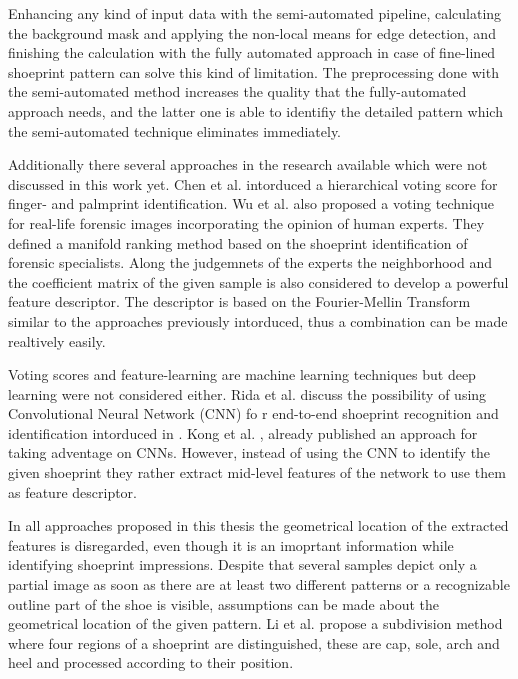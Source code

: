 \documentclass[draft,final]{vutinfth} %
\begin{document}
Enhancing any kind of input data with the semi-automated pipeline, calculating the background mask and applying the non-local means for edge detection, and finishing the calculation with the fully automated approach in case of fine-lined shoeprint pattern can solve this kind of limitation.
The preprocessing done with the semi-automated method increases the quality that the fully-automated approach needs, and the latter one is able to identifiy the detailed pattern which the semi-automated technique eliminates immediately.
\par
Additionally there several approaches in the research available which were not discussed in this work yet.
Chen et al. \cite{chen2013hierarchical} intorduced a hierarchical voting score for finger- and palmprint identification.
Wu et al. \cite{wu2019losgsr} also proposed a voting technique for real-life forensic images incorporating the opinion of human experts.
They defined a manifold ranking method based on the shoeprint identification of forensic specialists.
Along the judgemnets of the experts the neighborhood and the coefficient matrix of the given sample is also considered to develop a powerful feature descriptor.
The descriptor is based on the Fourier-Mellin Transform similar to the approaches previously intorduced, thus a combination can be made realtively easily.
\par
Voting scores and feature-learning are machine learning techniques but deep learning \cite{lecun2015deep} were not considered either.
Rida et al. \cite{rida2019forensic} discuss the possibility of using Convolutional Neural Network (CNN) fo
r end-to-end shoeprint recognition and identification intorduced in \cite{lecun1998gradient}.
Kong et al. \cite{kong2017cross}, \cite{kong2019cross} already published an approach for taking adventage on CNNs.
However, instead of using the CNN to identify the given shoeprint they rather extract mid-level features of the network to use them as feature descriptor.
\par
In all approaches proposed in this thesis the geometrical location of the extracted features is disregarded, even though it is an imoprtant information while identifying shoeprint impressions.
Despite that several samples depict only a partial image as soon as there are at least two different patterns or a recognizable outline part of the shoe is visible, assumptions can be made about the geometrical location of the given pattern.
Li et al. \cite{li2015secondary} propose a subdivision method where four regions of a shoeprint are distinguished, these are cap, sole, arch and heel and processed according to their position.
\end{document}
